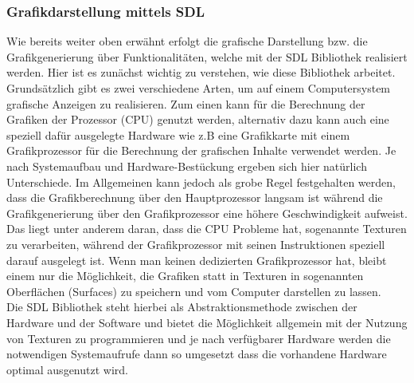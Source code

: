 \subsubsection{Grafikdarstellung mittels SDL}
Wie bereits weiter oben erwähnt erfolgt die  grafische Darstellung bzw. die Grafikgenerierung über Funktionalitäten, welche mit der SDL Bibliothek realisiert werden.
Hier ist es zunächst wichtig zu verstehen, wie diese Bibliothek arbeitet. \\
Grundsätzlich gibt es zwei verschiedene Arten, um auf einem Computersystem grafische Anzeigen zu realisieren. Zum einen kann für die Berechnung der Grafiken der Prozessor (CPU)  genutzt werden, alternativ dazu kann auch eine speziell dafür ausgelegte Hardware wie z.B eine Grafikkarte mit einem Grafikprozessor für die Berechnung der grafischen Inhalte verwendet werden.  Je nach Systemaufbau und Hardware-Bestückung ergeben sich hier natürlich Unterschiede. Im Allgemeinen kann jedoch als grobe Regel festgehalten werden, dass die Grafikberechnung über den Hauptprozessor langsam ist während die Grafikgenerierung über den Grafikprozessor eine höhere Geschwindigkeit aufweist. \\
Das liegt unter anderem daran, dass die CPU Probleme hat, sogenannte Texturen zu verarbeiten, während der Grafikprozessor mit seinen Instruktionen speziell darauf ausgelegt ist.  Wenn man keinen dedizierten Grafikprozessor hat, bleibt einem nur die Möglichkeit, die Grafiken  statt in Texturen in sogenannten  Oberflächen (Surfaces)  zu speichern und vom Computer darstellen zu lassen. \\
Die SDL Bibliothek steht hierbei als Abstraktionsmethode zwischen der Hardware und der Software und bietet die Möglichkeit allgemein mit der Nutzung von Texturen zu programmieren und je nach verfügbarer Hardware werden die notwendigen Systemaufrufe dann so umgesetzt dass die vorhandene Hardware optimal ausgenutzt wird.
